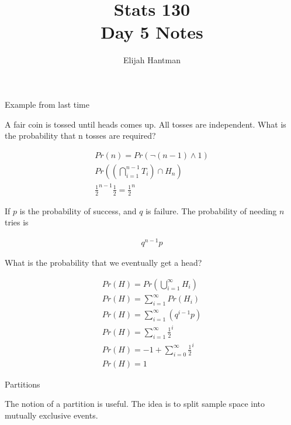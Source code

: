 \documentclass{report}
\title{\Huge{Stats 130}\\Day 5 Notes}
\author{\huge{Elijah Hantman}}
\date{}
\begin{document}
\maketitle
\newpage

\begin{description}
    \item {\large Example from last time}
        \begin{mdframed}
            A fair coin is tossed until heads comes up.
            All tosses are independent. What is the probability
            that n tosses are required?

            \begin{gather}
                Pr(n) = Pr(\neg (n-1) \land 1)\\
                Pr((\bigcap_{i=1}^{n-1} T_i) \cap H_n)\\
                \frac{1}{2}^{n-1} \frac{1}{2} = \frac{1}{2}^n
            \end{gather}

            If $p$ is the probability of success, and $q$ is
            failure. The probability of needing $n$ tries is

            \begin{gather}
                q^{n-1}p
            \end{gather}

            What is the probability that we eventually get a head?

            \begin{gather}
                Pr(H) = Pr(\bigcup_{i=1}^\infty H_i)\\
                Pr(H) = \sum_{i=1}^\infty Pr(H_i)\\
                Pr(H) = \sum_{i=1}^\infty (q^{i-1}p)\\
                Pr(H) = \sum_{i=1}^\infty \frac{1}{2}^{i}\\
                Pr(H) = -1 + \sum_{i=0}^\infty \frac{1}{2}^{i}\\
                Pr(H) = 1
            \end{gather}

        \end{mdframed}

    \item {\large Partitions}
        \begin{mdframed}
            The notion of a partition is useful. The idea is to split
            sample space into mutually exclusive events.


\end{mdframed}
\end{description}
\end{document}
